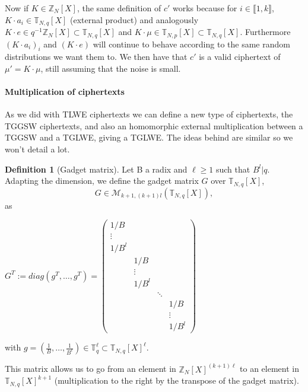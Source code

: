 \documentclass{article}
\newcommand{\Z}{\mathbb{Z}}
\newcommand{\T}{\mathbb{T}}
\theoremstyle{definition}
\newtheorem{definition}{Definition}[section]
\theoremstyle{Theorem}
\begin{document}
Now if $K \in \Z_N[X]$, the same definition of $c'$ works because for $i\in \llbracket 1,k\rrbracket$, $K\cdot a_i \in \T_{N,q}[X]$ (external product) and analogously $K\cdot e\in q^{-1}\Z_N[X]\subset\T_{N,q}[X]$ and $K\cdot \mu \in \T_{N,p}[X]\subset\T_{N,q}[X]$. Furthermore $(K\cdot a_i)_i$ and $(K\cdot e)$ will continue to behave according to the same random distributions we want them to. We then have that $c'$ is a valid ciphertext of $\mu' = K \cdot \mu$, still assuming that the noise is small. 

\paragraph{Multiplication of ciphertexts}

As we did with TLWE ciphertexts we can define a new type of ciphertexts, the TGGSW ciphertexts, and also an homomorphic external multiplication between a TGGSW and a TGLWE, giving a TGLWE. The ideas behind are similar so we won't detail a lot. 

\begin{definition}[Gadget matrix]

Let B a radix and $\ell \geq1$ such that $B^l|q$. 
Adapting the dimension, we define the gadget matrix $G$ over $\T_{N,q}[X]$, 
\[
G \in \mathcal{M}_{k+1,(k+1)l}(\T_{N,q}[X]),
\]
as
\begin{center}
    $G^T:= diag(g^T, \dots, g^T)=
    \begin{pmatrix}
    1/B & & & \\
    \vdots & & &\\
    1/B^l & & &\\
    & 1/B & & \\
    & \vdots & &\\
    & 1/B^l & & \\
    & & \ddots &\\
    & & & 1/B \\
    & & & \vdots \\
    & & & 1/B^l
    \end{pmatrix}$
\end{center}
with $g = \left( \frac{1}{B}, \ldots, \frac{1}{B^\ell} \right) \in \mathbb{T}_q^\ell\subset\mathbb{T}_{N,q}[X]^\ell$. 
    
\end{definition}

This matrix allows us to go from an element in $\Z_N[X]^{(k+1)\ell}$ to an element in $\T_{N,q}[X]^{k+1}$ (multiplication to the right by the transpose of the gadget matrix). 
\end{document}
